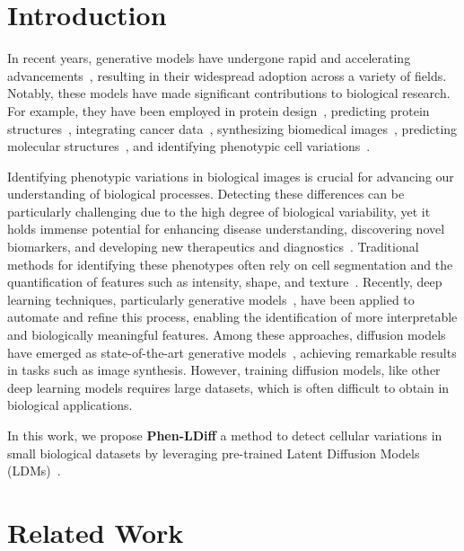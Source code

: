 \section{Introduction}
\label{sec:intro}

In recent years, generative models have undergone rapid and accelerating advancements~\cite{ddim,ddpm,normalizing_flow,generative_models_survey,bourou_conditional}, resulting in their widespread adoption across a variety of fields. Notably, these models have made significant contributions to biological research. For example, they have been employed in protein design~\cite{protein_design}, predicting protein structures~\cite{alphafold}, integrating cancer data~\cite{cancer_data}, synthesizing biomedical images~\cite{biomedical_1,biomedical_2}, predicting molecular structures~\cite{molgan,denovo}, and identifying phenotypic cell variations~\cite{bourou_1,bourou_2,Lamiable2023}.

Identifying phenotypic variations in biological images is crucial for advancing our understanding of biological processes. Detecting these differences can be particularly challenging due to the high degree of biological variability, yet it holds immense potential for enhancing disease understanding, discovering novel biomarkers, and developing new therapeutics and diagnostics~\cite{cellular_profiling,cellular_profiling_2,cellular_profiling_3}. Traditional methods for identifying these phenotypes often rely on cell segmentation and the quantification of features such as intensity, shape, and texture~\cite{cellular_profiling}. Recently, deep learning techniques, particularly generative models~\cite{Lamiable2023,bourou_1,bourou_2}, have been applied to automate and refine this process, enabling the identification of more interpretable and biologically meaningful features. Among these approaches, diffusion models have emerged as state-of-the-art generative models~\cite{diffusion_beat_gans}, achieving remarkable results in tasks such as image synthesis. However, training diffusion models, like other deep learning models requires large datasets, which is often difficult to obtain in biological applications.

In this work, we propose \textbf{Phen-LDiff} a method to detect cellular variations in small biological datasets by leveraging pre-trained Latent Diffusion Models (LDMs)~\cite{stable_diffusion}.







\section{Related Work}


